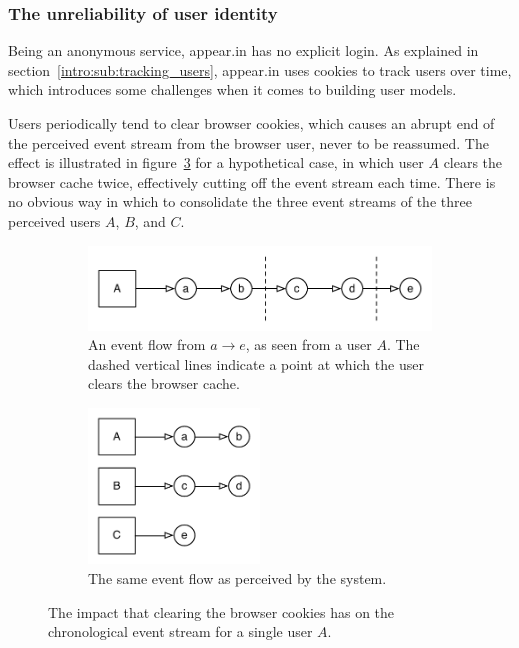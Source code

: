 \subsubsection{The unreliability of user identity}
\label{survey:unreliable_identity}

Being an anonymous service, appear.in has no explicit login. As explained in section~\ref{intro:sub:tracking_users}, appear.in uses cookies to track users over time, which introduces some challenges when it comes to building user models.

Users periodically tend to clear browser cookies, which causes an abrupt end of the perceived event stream from the browser user, never to be reassumed. The effect is illustrated in figure~\ref{fig:clear_cookie_impact} for a hypothetical case, in which user $A$ clears the browser cache twice, effectively cutting off the event stream each time. There is no obvious way in which to consolidate the three event streams of the three perceived users $A$, $B$, and $C$.

\begin{figure}[h]
  \centering
    \begin{subfigure}[t]{0.8\textwidth}
      \includegraphics[width=\textwidth]{Figures/event-flow-cache-break-1}
      \caption{An event flow from $a \rightarrow e$, as seen from a user $A$. The dashed vertical lines indicate a point at which the user clears the browser cache.}
      \label{fig:cache_break1}
    \end{subfigure}
    \begin{subfigure}[t]{0.8\textwidth}
      \includegraphics[width=0.5\textwidth]{Figures/event-flow-cache-break-2}
      \caption{The same event flow as perceived by the system.}
      \label{fig:cache_break2}
    \end{subfigure}

    \caption{The impact that clearing the browser cookies has on the chronological event stream for a single user $A$.}
    \label{fig:clear_cookie_impact}
\end{figure}

